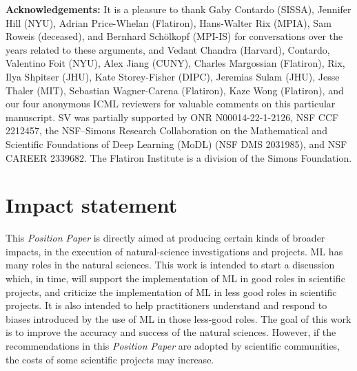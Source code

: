 \documentclass{article}
\newcommand{\documentname}{\textsl{Position Paper}}
\renewcommand{\paragraph}[1]{\noindent\par\textbf{#1}}
\begin{document}
\paragraph{Acknowledgements:}
It is a pleasure to thank
  Gaby Contardo (SISSA),
  Jennifer Hill (NYU),
  Adrian Price-Whelan (Flatiron),
  Hans-Walter Rix (MPIA),
  Sam Roweis (deceased), and
  Bernhard Sch\"olkopf (MPI-IS)
for conversations over the years related to these arguments, and
  Vedant Chandra (Harvard),
  Contardo,
  Valentino Foit (NYU),
  Alex Jiang (CUNY),
  Charles Margossian (Flatiron),
  Rix,
  Ilya Shpitser (JHU),
  Kate Storey-Fisher (DIPC),
  Jeremias Sulam (JHU),
  Jesse Thaler (MIT),
  Sebastian Wagner-Carena (Flatiron),
  Kaze Wong (Flatiron), and
  our four anonymous ICML reviewers
for valuable comments on this particular manuscript.
SV was partially supported by ONR N00014-22-1-2126, NSF CCF 2212457, the NSF–Simons Research Collaboration
on the Mathematical and Scientific Foundations of Deep Learning (MoDL) (NSF DMS 2031985), and NSF
CAREER 2339682.
The Flatiron Institute is a division of the Simons Foundation.

\section*{Impact statement}
This \documentname{} is directly aimed at producing certain kinds of broader impacts, in the execution of natural-science investigations and projects.
ML has many roles in the natural sciences.
This work is intended to start a discussion which, in time, will support the implementation of ML in good roles in scientific projects, and criticize the implementation of ML in less good roles in scientific projects.
It is also intended to help practitioners understand and respond to biases introduced by the use of ML in those less-good roles.
The goal of this work is to improve the accuracy and success of the natural sciences.
However, if the recommendations in this \documentname{} are adopted by scientific communities, the costs of some scientific projects may increase.




\clearpage\appendix
\end{document}

